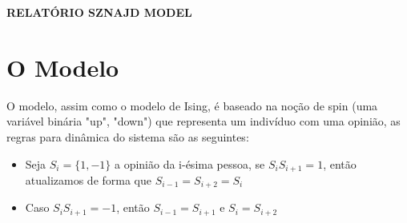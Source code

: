 \documentclass{article}
\begin{document}
\begin{center}
\textbf{RELATÓRIO SZNAJD MODEL} 
\end{center}

\section*{O Modelo}
O modelo, assim como o modelo de Ising, é baseado na noção de spin (uma variável binária "up", "down") que representa um indivíduo com uma opinião, as regras para dinâmica do sistema são as seguintes:
\begin{itemize}
\item Seja $S_i=\{ 1, -1\}$ a opinião da i-ésima pessoa, se $S_i S_{i+1} = 1$, então atualizamos de forma que $S_{i-1} = S_{i+2}= S_i$

\item Caso $S_i S_{i+1} = -1$, então $S_{i-1}=S_{i+1}$ e $S_{i}=S_{i+2}$
  
\end{itemize}
\end{document}
